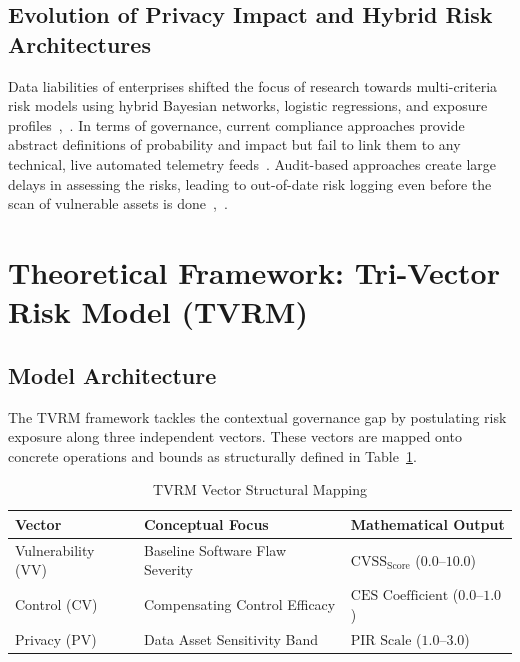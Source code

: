 \documentclass[conference,a4paper]{IEEEtran}
\begin{document}
\subsection{Evolution of Privacy Impact and Hybrid Risk Architectures}
Data liabilities of enterprises shifted the focus of research towards multi-criteria risk models using hybrid Bayesian networks, logistic regressions, and exposure profiles~\cite{b19},~\cite{b6}. In terms of governance, current compliance approaches provide abstract definitions of probability and impact but fail to link them to any technical, live automated telemetry feeds~\cite{b17}. Audit-based approaches create large delays in assessing the risks, leading to out-of-date risk logging even before the scan of vulnerable assets is done~\cite{b12},~\cite{b16}.

\section{Theoretical Framework: Tri-Vector Risk Model (TVRM)}
\subsection{Model Architecture}
The TVRM framework tackles the contextual governance gap by postulating risk exposure along three independent vectors. These vectors are mapped onto concrete operations and bounds as structurally defined in Table~\ref{tab:vectors}.

\begin{table}[htbp]
\caption{TVRM Vector Structural Mapping}
\begin{center}
\begin{tabular}{lp{2.4cm}p{2.7cm}}
\toprule
\textbf{Vector} & Conceptual Focus & Mathematical Output \\
\midrule
Vulnerability (VV) & Baseline Software Flaw Severity & $\text{CVSS}_{\text{Score}}$ ($0.0$--$10.0$) \\
Control (CV)       & Compensating Control Efficacy  & $\text{CES Coefficient}$ ($0.0$--$1.0$) \\
Privacy (PV)       & Data Asset Sensitivity Band    & $\text{PIR Scale}$ ($1.0$--$3.0$) \\
\bottomrule
\end{tabular}
\label{tab:vectors}
\end{center}
\end{table}
\end{document}
